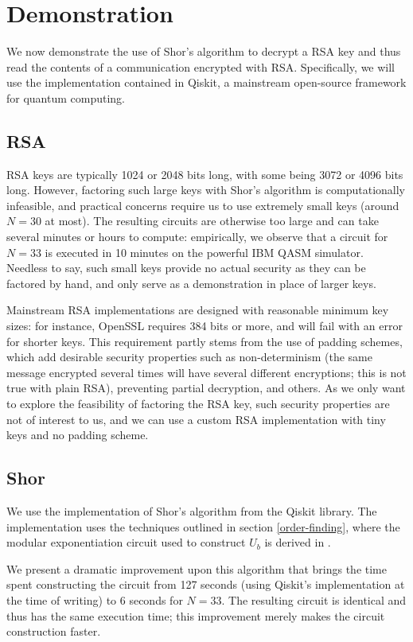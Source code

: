 \documentclass[conference]{IEEEtran}
\begin{document}
\section{Demonstration}
We now demonstrate the use of Shor's algorithm to decrypt a RSA key and thus read the contents of a communication encrypted with RSA. Specifically, we will use the implementation contained in Qiskit, a mainstream open-source framework for quantum computing.

\subsection{RSA}
RSA keys are typically 1024 or 2048 bits long, with some being 3072 or 4096 bits long. However, factoring such large keys with Shor's algorithm is computationally infeasible, and practical concerns require us to use extremely small keys (around $N=30$ at most). The resulting circuits are otherwise too large and can take several minutes or hours to compute: empirically, we observe that a circuit for $N=33$ is executed in 10 minutes on the powerful IBM QASM simulator. Needless to say, such small keys provide no actual security as they can be factored by hand, and only serve as a demonstration in place of larger keys.

Mainstream RSA implementations are designed with reasonable minimum key sizes: for instance, OpenSSL requires 384 bits or more, and will fail with an error for shorter keys. This requirement partly stems from the use of padding schemes, which add desirable security properties such as non-determinism (the same message encrypted several times will have several different encryptions; this is not true with plain RSA), preventing partial decryption, and others. As we only want to explore the feasibility of factoring the RSA key, such security properties are not of interest to us, and we can use a custom RSA implementation with tiny keys and no padding scheme.

\subsection{Shor}
We use the implementation of Shor's algorithm from the Qiskit library. The implementation uses the techniques outlined in section \ref{order-finding}, where the modular exponentiation circuit used to construct $U_b$ is derived in \cite{vbe}.

We present a dramatic improvement upon this algorithm that brings the time spent constructing the circuit from 127 seconds (using Qiskit's implementation at the time of writing) to 6 seconds for $N=33$. The resulting circuit is identical and thus has the same execution time; this improvement merely makes the circuit construction faster.
\end{document}
